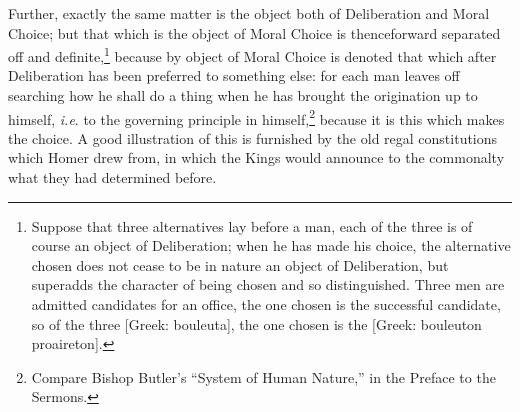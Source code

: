 Further, exactly the same matter is the object both of Deliberation and Moral
Choice; but that which is the object of Moral Choice is thenceforward separated
off and definite,\footnote{Suppose that three alternatives lay before a man, each of the three is of
course an object of Deliberation; when he has made his choice, the alternative
chosen does not cease to be in nature an object of Deliberation, but superadds
the character of being chosen and so distinguished. Three men are admitted
candidates for an office, the one chosen is the successful candidate, so of the
three [Greek: bouleuta], the one chosen is the [Greek: bouleuton proaireton].}
because by object of Moral Choice is denoted that which after Deliberation has
been preferred to something else: for each man leaves off searching how he
shall do a thing when he has brought the origination up to himself, \emph{i.e}.
to the governing principle in himself,\footnote{Compare Bishop Butler’s “System of Human Nature,” in the
Preface to the Sermons.}
because it is this which makes the choice. A good illustration of this is
furnished by the old regal constitutions which Homer drew from, in which the
Kings would announce to the commonalty what they had determined before.

